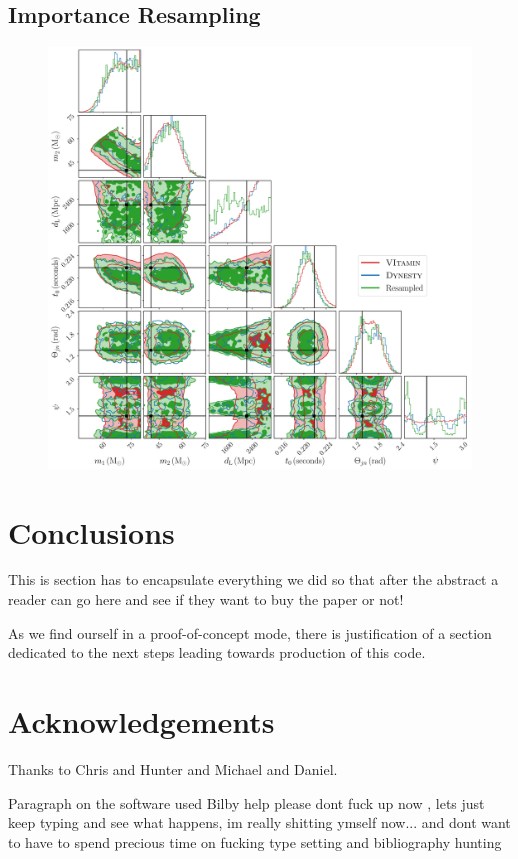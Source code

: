 \documentclass[aps,superscriptaddress,twocolumn,nopreprintnumbers,floatfix,groupedaddress]{revtex4-1}
\newcommand{\bilby}{{\sc Bilby}\xspace}
\newcommand{\doublefigwidth}{17.2cm}
\begin{document}
\subsection{Importance Resampling}


\begin{figure}[h]
	\centering
	\includegraphics[width=\doublefigwidth]{figs/resample_corner.pdf}
	\caption{}
	\label{fig:final_corner}
\end{figure}



\section{Conclusions}\label{conc}

This is section has to encapsulate everything we did so that after the abstract a reader can go here and see if they want to buy the paper or not!

As we find ourself in a proof-of-concept mode, there is justification of a section dedicated to the next steps leading towards production of this code.


\section*{Acknowledgements}

Thanks to Chris and Hunter and Michael and Daniel.

Paragraph on the software used \bilby\cite{bilby} \cite{0004-637X-748-2-136}help please dont fuck up now , lets just keep typing and see what happens, im really shitting ymself now... and dont want to have to spend precious time on fucking type setting and bibliography hunting \cite{emcee}
%

%
\cleardoublepage

\end{document}
